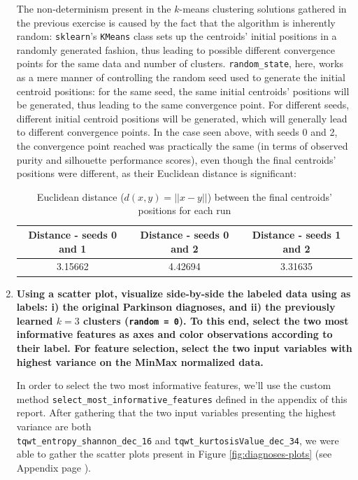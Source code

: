 \documentclass[12pt]{article}
\begin{document}
\begin{enumerate}[leftmargin=\labelsep]
        The non-determinism present in the $k$-means clustering solutions gathered
        in the previous exercise is caused by the fact that the algorithm is
        inherently random: \texttt{sklearn}'s \texttt{KMeans} class sets up
        the centroids' initial positions in a randomly generated fashion,
        thus leading to possible different convergence points for the same
        data and number of clusters. \texttt{random\_state}, here, works
        as a mere manner of controlling the random seed used to generate
        the initial centroid positions: for the same seed, the same
        initial centroids' positions will be generated, thus leading to
        the same convergence point. For different seeds, different
        initial centroid positions will be generated, which will generally lead
        to different convergence points. In the case seen above, with seeds 0
        and 2, the convergence point reached was practically the same (in terms of
        observed purity and silhouette performance scores), even though the final
        centroids' positions were different, as their Euclidean distance is significant:

        \begin{table}[H]
          \centering
          \begin{tabular}{c|c|c}
            Distance - seeds 0 and 1 & Distance - seeds 0 and 2 & Distance - seeds 1 and 2 \\ \hline
            3.15662                  & 4.42694                  & 3.31635
          \end{tabular}
          \caption{Euclidean distance ($d(x, y) = ||x - y||$) between the final centroids' positions for each run}
          \label{tab:centroid-distances}
        \end{table}

  \item \textbf{Using a scatter plot, visualize side-by-side the labeled data using as labels: i) the original
          Parkinson diagnoses, and ii) the previously learned $k = 3$ clusters (\texttt{random = 0}). To this end, select
          the two most informative features as axes and color observations according to their label. For feature
          selection, select the two input variables with highest variance on the MinMax normalized data.}

        In order to select the two most informative features, we'll use the
        custom method \texttt{select\_most\_informative\_features} defined in
        the appendix of this report. After gathering that the two
        input variables presenting the highest variance are both \\
        \texttt{tqwt\_entropy\_shannon\_dec\_16} and
        \texttt{tqwt\_kurtosisValue\_dec\_34}, we were able to gather the
        scatter plots present in Figure \ref{fig:diagnoses-plots}
        (see Appendix page \pageref{fig:diagnoses-plots}).


\end{enumerate}
\end{document}
